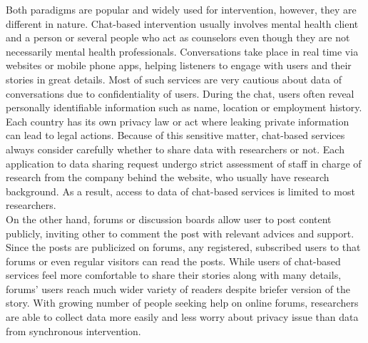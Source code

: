 Both paradigms are popular and widely used for intervention, however, they are different in nature. Chat-based intervention usually involves mental health client and a person or several people who act as counselors even though they are not necessarily mental health professionals. Conversations take place in real time via websites or mobile phone apps, helping listeners to engage with users and their stories in great details. Most of such services are very cautious about data of conversations due to confidentiality of users. During the chat, users often reveal personally identifiable information such as name, location or employment history. Each country has its own privacy law or act where leaking private information can lead to legal actions. Because of this sensitive matter, chat-based services always consider carefully whether to share data with researchers or not. Each application to data sharing request undergo strict assessment of staff in charge of research from the company behind the website, who usually have research background. As a result, access to data of chat-based services is limited to most researchers.\\
On the other hand, forums or discussion boards allow user to post content publicly, inviting other to comment the post with relevant advices and support. Since the posts are publicized on forums, any registered, subscribed users to that forums or even regular visitors can read the posts. While users of chat-based services feel more comfortable to share their stories along with many details, forums' users reach much wider variety of readers despite briefer version of the story. With growing number of people seeking help on online forums, researchers are able to collect data more easily and less worry about privacy issue than data from synchronous intervention.\\
